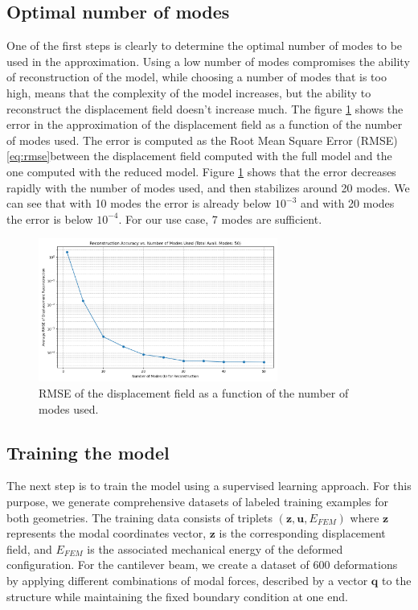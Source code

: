 \subsection{Optimal number of modes}
\label{sec:optimal_number_modes}
One of the first steps is clearly to determine the optimal number of modes to be used in the approximation. Using a low number of modes compromises the ability of reconstruction of the model, while choosing a number of modes that is too high, means that the complexity of the model increases, but the ability to reconstruct the displacement field doesn't increase much. The figure \ref{fig:optimal_number_modes} shows the error in the approximation of the displacement field as a function of the number of modes used. The error is computed as the Root Mean Square Error (RMSE) \eqref{eq:rmse}between the displacement field computed with the full model and the one computed with the reduced model. Figure \ref{fig:optimal_number_modes} shows that the error decreases rapidly with the number of modes used, and then stabilizes around 20 modes. We can see that with 10 modes the error is already below \(10^{-3}\) and with 20 modes the error is below \(10^{-4}\). For our use case, 7 modes are sufficient.
\begin{figure}[H]
    \centering
    \includegraphics[width=0.7\textwidth]{Images/rmse_vs_modes.png}
    \caption{RMSE of the displacement field as a function of the number of modes used.}
    \label{fig:optimal_number_modes}
\end{figure}

\subsection{Training the model}
\label{sec:training_model}
The next step is to train the model using a supervised learning approach. For this purpose, we generate comprehensive datasets of labeled training examples for both geometries. The training data consists of triplets $(\mathbf{z}, \mathbf{u}, E_{FEM})$ where $\mathbf{z}$ represents the modal coordinates vector, $\mathbf{z}$ is the corresponding displacement field, and $E_{FEM}$ is the associated mechanical energy of the deformed configuration.
For the cantilever beam, we create a dataset of 600 deformations by applying different combinations of modal forces, described by a vector \(\mathbf{q}\) to the structure while maintaining the fixed boundary condition at one end. 


